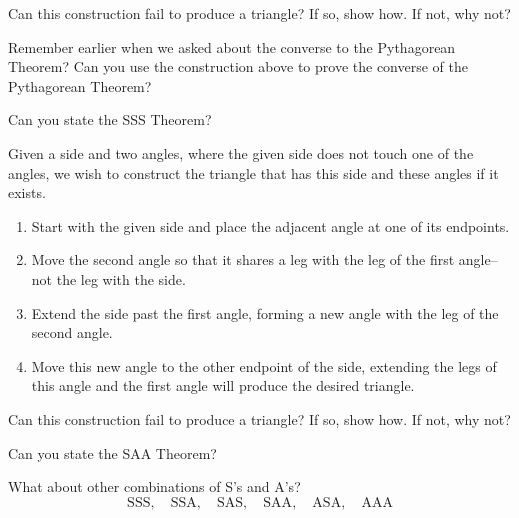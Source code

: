 \begin{question} 
Can this construction fail to produce a triangle? If so, show how. If
not, why not?
\end{question}
\QM

\begin{question}
Remember earlier when we asked about the converse to the Pythagorean
Theorem? Can you use the construction above
to prove the converse of the Pythagorean Theorem?
\end{question}
\QM

\begin{question}
Can you state the SSS Theorem?
\end{question}
\QM


\begin{construction} 
Given a side and two angles, where the given side does not touch one
of the angles, we wish to construct the triangle that has this side
and these angles if it exists.
\begin{enumerate}
\item Start with the given side and place the adjacent angle at one of
  its endpoints.
\item Move the second angle so that it shares a leg with the leg of
  the first angle--not the leg with the side.
\item Extend the side past the first angle, forming a new angle with
  the leg of the second angle.
\item Move this new angle to the other endpoint of the side, extending
  the legs of this angle and the first angle will produce the desired
  triangle.
\end{enumerate}
\end{construction}


\begin{question} 
Can this construction fail to produce a triangle? If so, show how. If
not, why not?
\end{question}
\QM

\begin{question}
Can you state the SAA Theorem?
\end{question}
\QM

\begin{question} What about other combinations of S's and A's?
\[
\text{SSS},\quad \text{SSA},\quad \text{SAS},\quad \text{SAA},\quad \text{ASA},\quad \text{AAA} 
\]
\end{question}
\QM

